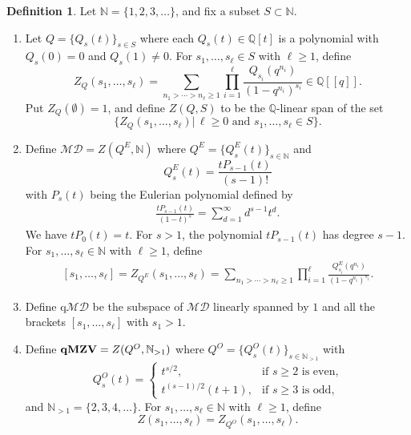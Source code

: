 \documentclass[12pt, reqno]{amsart}
\theoremstyle{definition}
\newtheorem{definition}[theorem]{Definition}
\theoremstyle{remark}
\numberwithin{equation}{section}
\newcommand{\N}{ \mathbb N }
\newcommand{\Q}{ \mathbb Q }
\newcommand{\qMZV}{ {\bf qMZV} }
\numberwithin{equation}{section}
\begin{document}
\begin{definition}  \label{def_qMZV}
Let $\N = \{1,2,3, \ldots\}$, and fix a subset $S \subset \N$. 
\begin{enumerate}
\item[{\rm (i)}]
Let $Q = \{Q_s(t)\}_{s \in S}$ where each $Q_s(t) \in \Q[t]$ is a polynomial 
with $Q_s(0) = 0$ and $Q_s(1) \ne 0$. For $s_1, \ldots, s_\ell \in S$ 
with $\ell \ge 1$, define
$$
Z_Q(s_1, \ldots, s_\ell)
= \sum_{n_1 > \cdots > n_\ell \ge 1} \prod_{i=1}^\ell 
  \frac{Q_{s_i}(q^{n_i})}{(1-q^{n_i})^{s_i}}
\in \Q[[q]].
$$
Put $Z_Q(\emptyset) = 1$, and define $Z(Q, S)$ to be the $\Q$-linear span 
of the set
$$
\{Z_Q(s_1, \ldots, s_\ell)| \, \ell \ge 0 \text{ and }
s_1, \ldots, s_\ell \in S \}.
$$

\item[{\rm (ii)}]
Define $\mathcal {MD} = Z(Q^E, \N)$ where $Q^E = \{Q_s^E(t)\}_{s \in \N}$
and 
$$
Q_s^E(t) = \frac{tP_{s-1}(t)}{(s-1)!}
$$ 
with $P_s(t)$ being the Eulerian polynomial defined by 
\begin{eqnarray}   \label{def_qMZV.01}
\frac{tP_{s-1}(t)}{(1-t)^s} = \sum_{d=1}^\infty d^{s-1}t^d.
\end{eqnarray}  
We have $t P_{0}(t) = t$.
For $s > 1$, the polynomial $t P_{s-1}(t)$ has degree $s - 1$. 
For $s_1, \ldots, s_\ell \in \N$ with $\ell \ge 1$, define
\begin{eqnarray}   \label{def_qMZV.02}
[s_1, \ldots, s_\ell] 
= Z_{Q^E}(s_1, \ldots, s_\ell)
= \sum_{n_1 > \cdots > n_\ell \ge 1} \prod_{i=1}^\ell 
  \frac{Q_{s_i}^E(q^{n_i})}{(1-q^{n_i})^{s_i}}.
\end{eqnarray}  

\item[{\rm (iii)}]
Define $\text{q}\mathcal {MD}$ be the subspace of $\mathcal {MD}$ linearly 
spanned by $1$ and all the brackets $[s_1, \ldots, s_\ell]$ with $s_1 > 1$. 

\item[{\rm (iv)}]
Define $\qMZV = Z(Q^O, \N_{>1})$ where 
$Q^O = \{Q_s^O(t)\}_{s \in \N_{>1}}$ with 
$$
  Q_s^O(t) 
= \begin{cases}
  t^{s/2},           &\text{if $s \ge 2$ is even,} \\
  t^{(s-1)/2} (t+1), &\text{if $s \ge 3$ is odd,}
  \end{cases}
$$
and $\N_{>1} = \{2,3,4, \ldots\}$.
For $s_1, \ldots, s_\ell \in \N$ with $\ell \ge 1$, define
$$
Z(s_1, \ldots, s_\ell) = Z_{Q^O}(s_1, \ldots, s_\ell).
$$
\end{enumerate}
\end{definition}
\end{document}

